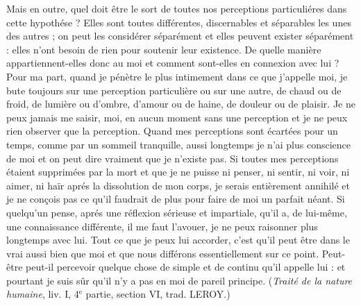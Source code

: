Mais en outre, quel doit être le sort de toutes nos perceptions
particuliéres dans cette hypothése ? Elles sont
toutes différentes, discernables et séparables les unes des
autres ; on peut les considérer séparément et elles peuvent
exister séparément : elles n’ont besoin de rien pour soutenir
leur existence. De quelle manière appartiennent-elles donc
au moi et comment sont-elles en connexion avec lui ?
Pour ma part, quand je pénètre le plus intimement dans
ce que j’appelle moi, je bute toujours sur une perception
particulière ou sur une autre, de chaud ou de froid, de
lumière ou d’ombre, d’amour ou de haine, de douleur ou
de plaisir. Je ne peux jamais me saisir, moi, en aucun
moment sans une perception et je ne peux rien observer
que la perception. Quand mes perceptions sont écartées
pour un temps, comme par un sommeil tranquille, aussi
longtemps je n’ai plus conscience de moi et on peut dire
vraiment que je n’existe pas. Si toutes mes perceptions
étaient supprimées par la mort et que je ne puisse ni
penser, ni sentir, ni voir, ni aimer, ni haïr aprés la dissolution
de mon corps, je serais entièrement annihilé et
je ne conçois pas ce qu’il faudrait de plus pour faire de
moi un parfait néant. Si quelqu’un pense, aprés une réflexion
sérieuse et impartiale, qu’il a, de lui-même, une
connaissance différente, il me faut l’avouer, je ne peux
raisonner plus longtemps avec lui. Tout ce que je peux
lui accorder, c’est qu’il peut être dans le vrai aussi bien
que moi et que nous différons essentiellement sur ce point.
Peut-être peut-il percevoir quelque chose de simple et de
continu qu’il appelle lui : et pourtant je suis sûr qu'il n’y
a pas en moi de pareil principe. ({\it Traité de la nature
humaine}, liv. I, 4$^\text{e}$ partie, section VI, trad. L{\footnotesize EROY}.)

